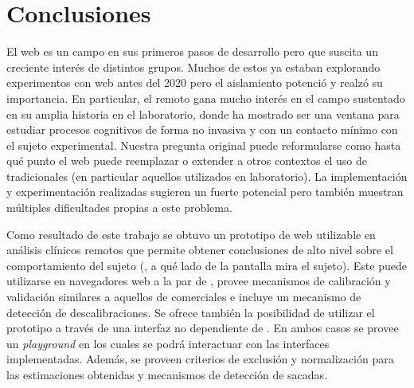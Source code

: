 \chapter{Conclusiones}

El \eyetracking web es un campo en sus primeros pasos de desarrollo pero que
suscita un creciente interés de distintos grupos.
Muchos de estos ya estaban explorando experimentos con \eyetracking web antes
del 2020 pero el aislamiento potenció y realzó su importancia.
En particular, el \eyetracking remoto gana mucho interés en el campo sustentado
en su amplia historia en el laboratorio, donde ha mostrado ser una ventana para
estudiar procesos cognitivos de forma no invasiva y con un contacto mínimo con
el sujeto experimental.
Nuestra pregunta original puede reformularse como hasta qué punto el
\eyetracking web puede reemplazar o extender a otros contextos el uso de
\eyetrackers tradicionales (en particular aquellos utilizados en laboratorio).
La implementación y experimentación realizadas sugieren un fuerte potencial
pero también muestran múltiples dificultades propias a este problema.

Como resultado de este trabajo se obtuvo un prototipo de \eyetracker web
utilizable en análisis clínicos remotos que permite obtener conclusiones de
alto nivel sobre el comportamiento del sujeto (\eg, a qué lado de la pantalla
mira el sujeto).
Este puede utilizarse en navegadores web a la par de \jspsych, provee
mecanismos de calibración y validación similares a aquellos de \eyetrackers
comerciales e incluye un mecanismo de detección de descalibraciones.
Se ofrece también la posibilidad de utilizar el prototipo a través de una
interfaz no dependiente de \jspsych.
En ambos casos se provee un \textit{playground} en los cuales se podrá
interactuar con las interfaces implementadas.
Además, se proveen criterios de exclusión y normalización para las estimaciones
obtenidas y mecanismos de detección de sacadas.

